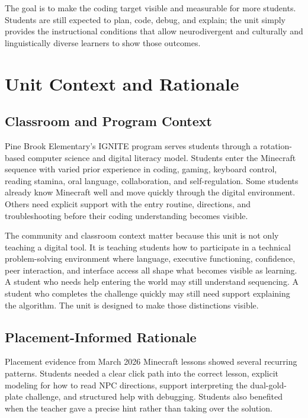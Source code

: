 \documentclass[12pt]{article}
\begin{document}
\begin{equitybox}
The goal is to make the coding target visible and measurable for more students. Students are still expected to plan, code, debug, and explain; the unit simply provides the instructional conditions that allow neurodivergent and culturally and linguistically diverse learners to show those outcomes.
\end{equitybox}

\section{Unit Context and Rationale}

\subsection{Classroom and Program Context}

Pine Brook Elementary's IGNITE program serves students through a rotation-based computer science and digital literacy model. Students enter the Minecraft sequence with varied prior experience in coding, gaming, keyboard control, reading stamina, oral language, collaboration, and self-regulation. Some students already know Minecraft well and move quickly through the digital environment. Others need explicit support with the entry routine, directions, and troubleshooting before their coding understanding becomes visible.

The community and classroom context matter because this unit is not only teaching a digital tool. It is teaching students how to participate in a technical problem-solving environment where language, executive functioning, confidence, peer interaction, and interface access all shape what becomes visible as learning. A student who needs help entering the world may still understand sequencing. A student who completes the challenge quickly may still need support explaining the algorithm. The unit is designed to make those distinctions visible.

\subsection{Placement-Informed Rationale}

Placement evidence from March 2026 Minecraft lessons showed several recurring patterns. Students needed a clear click path into the correct lesson, explicit modeling for how to read NPC directions, support interpreting the dual-gold-plate challenge, and structured help with debugging. Students also benefited when the teacher gave a precise hint rather than taking over the solution.
\end{document}
